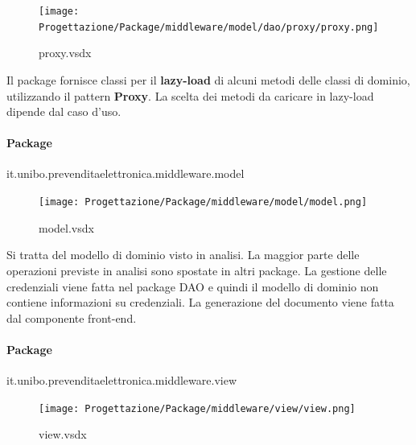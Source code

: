 \documentclass[a4paper]{article}
\begin{document}
\begin{figure}[H]
    \texttt{[image: Progettazione/Package/middleware/model/dao/proxy/proxy.png]}
    \centering
    \caption{proxy.vsdx}
\end{figure}

Il package fornisce classi per il \textbf{lazy-load} di alcuni metodi delle classi di dominio, utilizzando il pattern \textbf{Proxy}. La scelta dei metodi da caricare in lazy-load dipende dal caso d'uso.


\newpage

\paragraph{Package} it.unibo.prevenditaelettronica.middleware.model


\begin{figure}[H]
    \texttt{[image: Progettazione/Package/middleware/model/model.png]}
    \centering
    \caption{model.vsdx}
\end{figure}

Si tratta del modello di dominio visto in analisi. La maggior parte delle operazioni previste in analisi sono spostate in altri package. La gestione delle credenziali viene fatta nel package DAO e quindi il modello di dominio non contiene informazioni su credenziali. La generazione del documento viene fatta dal componente front-end.

\newpage

\paragraph{Package} it.unibo.prevenditaelettronica.middleware.view



\begin{figure}[H]
    \texttt{[image: Progettazione/Package/middleware/view/view.png]}
    \centering
    \caption{view.vsdx}
\end{figure}
\end{document}
